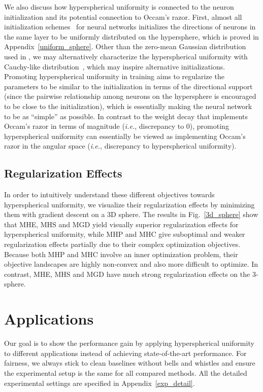 We also discuss how hyperspherical uniformity is connected to the neuron initialization and its potential connection to Occam's razor. First, almost all initialization schemes~\cite{lecun2012efficient,he2015delving,glorot2010understanding} for neural networks initializes the directions of neurons in the same layer to be uniformly distributed on the hypersphere, which is proved in Appendix~\ref{uniform_sphere}. Other than the zero-mean Gaussian distribution used in \cite{lecun2012efficient,he2015delving,glorot2010understanding}, we may alternatively characterize the hyperspherical uniformity with Cauchy-like distribution~\cite{szablowski1998uniform}, which may inspire alternative initializations. Promoting hyperspherical uniformity in training aims to regularize the parameters to be similar to the initialization in terms of the directional support (since the pairwise relationship among neurons on the hypersphere is encouraged to be close to the initialization), which is essentially making the neural network to be as ``simple'' as possible. In contrast to the weight decay that implements Occam's razor in terms of magnitude (\emph{i.e.}, discrepancy to $0$), promoting hyperspherical uniformity can essentially be viewed as implementing Occam's razor in the angular space (\emph{i.e.}, discrepancy to hyperspherical uniformity).

\subsection{Regularization Effects}

In order to intuitively understand these different objectives towards hyperspherical uniformity, we visualize their regularization effects by minimizing them with gradient descent on a 3D sphere. The results in Fig.~\ref{3d_sphere} show that MHE, MHS and MGD yield visually superior regularization effects for hyperspherical uniformity, while MHP and MHC give suboptimal and weaker regularization effects partially due to their complex optimization objectives. Because both MHP and MHC involve an inner optimization problem, their objective landscapes are highly non-convex and also more difficult to optimize. In contrast, MHE, MHS and MGD have much strong regularization effects on the 3-sphere.

\section{Applications}

Our goal is to show the performance gain by applying hyperspherical uniformity to different applications instead of achieving state-of-the-art performance. For fairness, we always stick to clean baselines without bells and whistles and ensure the experimental setup is the same for all compared methods. All the detailed experimental settings are specified in Appendix~\ref{exp_detail}.

